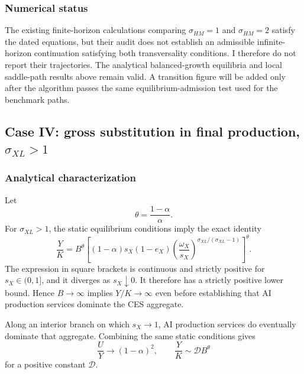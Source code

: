 \subsubsection{Numerical status}

The existing finite-horizon calculations comparing \(\sigma_{HM}=1\) and
\(\sigma_{HM}=2\) satisfy the dated equations, but their audit does not
establish an admissible infinite-horizon continuation satisfying both
transversality conditions. I therefore do not report their trajectories. The
analytical balanced-growth equilibria and local saddle-path results above remain
valid. A transition figure will be added only after the algorithm passes the
same equilibrium-admission test used for the benchmark paths.

\subsection{\texorpdfstring{Case IV: gross substitution in final production, \(\sigma_{XL}>1\)}{Case IV: gross substitution in final production, sigma XL > 1}}
\label{sec:axm-case-gross-substitution}

\subsubsection{Analytical characterization}

Let
\begin{equation}
 \theta=\frac{1-\alpha}{\alpha}.
 \label{eq:axm-theta}
\end{equation}
For \(\sigma_{XL}>1\), the static equilibrium conditions imply the exact
identity
\begin{equation}
 \frac{Y}{K}=B^\theta
 \left[
  (1-\alpha)s_X(1-e_X)
  \left(\frac{\omega_X}{s_X}\right)^{
   \sigma_{XL}/(\sigma_{XL}-1)}
 \right]^\theta.
 \label{eq:axm-high-sigma-exact-z}
\end{equation}
The expression in square brackets is continuous and strictly positive for
\(s_X\in(0,1]\), and it diverges as \(s_X\downarrow0\). It therefore has a
strictly positive lower bound. Hence \(B\to\infty\) implies
\(Y/K\to\infty\) even before establishing that AI production services dominate
the CES aggregate.

Along an interior branch on which \(s_X\to1\), AI production services do
eventually dominate that aggregate. Combining the same static conditions gives
\begin{equation}
 \frac{U}{Y}\to(1-\alpha)^2,\qquad
 \frac{Y}{K}\sim \mathcal D B^\theta
 \label{eq:axm-high-sigma-scaling}
\end{equation}
for a positive constant \(\mathcal D\).

